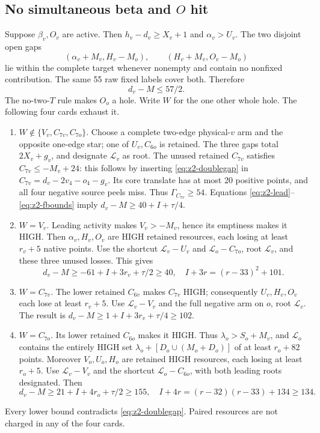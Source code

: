 \documentclass[11pt,letterpaper]{article}
\theoremstyle{definition}\newtheorem{definition}[theorem]{Definition}
\begin{document}
\subsection{No simultaneous beta and $O$ hit}
Suppose $\beta_v,O_v$ are active. Then $h_v-d_v\ge X_v+1$ and $\alpha_v>U_v$.
The two disjoint open gaps
\[
 (\alpha_v+M_v,H_v-M_o),\qquad(H_v+M_v,O_v-M_o)
\]
lie within the complete target whenever nonempty and contain no nonfixed contribution. The same 55 raw fixed labels cover both. Therefore
\begin{equation}\label{eq:z2-doublegap}d_v-M\le57/2.\end{equation}
The no-two-$T$ rule makes $O_o$ a hole. Write $W$ for the one other whole hole. The following four cards exhaust it.
\begin{enumerate}
\item $W\notin\{V_v,C_{7v},C_{7o}\}$. Choose a complete two-edge physical-$v$ arm and the opposite one-edge star; one of $U_v,C_{6o}$ is retained. The three gaps total $2X_v+g_v$, and designate $\mathcal L_v$ as root. The unused retained $C_{7v}$ satisfies $C_{7v}\le-M_v+24$: this follows by inserting \eqref{eq:z2-doublegap} in $C_{7v}=d_v-2v_4-o_4-g_v$. Its core translate has at most 20 positive points, and all four negative source peels miss. Thus $\Gamma_{C_{7v}}\ge54$. Equations \eqref{eq:z2-lead}--\eqref{eq:z2-fbounds} imply $d_v-M\ge40+I+\tau/4$.
\item $W=V_v$. Leading activity makes $V_v>-M_v$, hence its emptiness makes it HIGH. Then $\alpha_v,H_v,O_v$ are HIGH retained resources, each losing at least $r_v+5$ native points. Use the shortcut $\mathcal L_v-U_v$ and $\mathcal L_o-C_{7o}$, root $\mathcal L_v$, and these three unused losses. This gives
\[
 d_v-M\ge-61+I+3r_v+\tau/2\ge40,
 \quad I+3r=(r-33)^2+101.
\]
\item $W=C_{7v}$. The lower retained $C_{6v}$ makes $C_{7v}$ HIGH; consequently $U_v,H_v,O_v$ each lose at least $r_v+5$. Use $\mathcal L_v-V_v$ and the full negative arm on $o$, root $\mathcal L_v$. The result is $d_v-M\ge1+I+3r_v+\tau/4\ge102$.
\item $W=C_{7o}$. Its lower retained $C_{6o}$ makes it HIGH. Thus $\lambda_o>S_o+M_v$, and $\mathcal L_o$ contains the entirely HIGH set $\lambda_o+[D_o\cup(M_o+D_o)]$ of at least $r_o+82$ points. Moreover $V_o,U_o,H_o$ are retained HIGH resources, each losing at least $r_o+5$. Use $\mathcal L_v-V_v$ and the shortcut $\mathcal L_o-C_{6o}$, with both leading roots designated. Then
\[
 d_v-M\ge21+I+4r_o+\tau/2\ge155,
 \quad I+4r=(r-32)(r-33)+134\ge134.
\]
\end{enumerate}
Every lower bound contradicts \eqref{eq:z2-doublegap}. Paired resources are not charged in any of the four cards.
\end{document}
